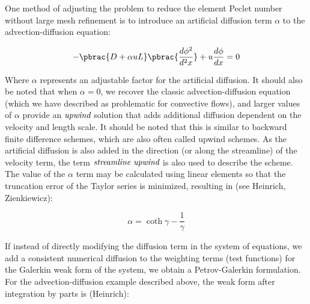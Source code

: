 One method of adjusting the problem to reduce the element Peclet number without large mesh refinement is to introduce an artificial diffusion term $\alpha$ to the advection-diffusion equation:

\begin{equation}
  -\pbrac{D+{\alpha}uL}\pbrac{\frac{d\phi^2}{d^2x}}+u\frac{d\phi}{dx}=0
  \label{eqn:directupwind}
\end{equation}

Where $\alpha$ represents an adjustable factor for the artificial diffusion. It should also be noted that when $\alpha=0$, we recover the classic advection-diffusion equation (which we have described as problematic for convective flows), and larger values of $\alpha$ provide an $\emph{upwind}$ solution that adds additional diffusion dependent on the velocity and length scale. It should be noted that this is similar to backward finite difference schemes, which are also often called upwind schemes. As the artificial diffusion is also added in the direction (or along the streamline) of the velocity term, the term $\emph{streamline upwind}$ is also used to describe the scheme. The value of the $\alpha$ term may be calculated using linear elements so that the truncation error of the Taylor series is minimized, resulting in (see Heinrich, Zienkiewicz):

\begin{equation}
  \alpha= {\coth{\gamma} - \frac{1}{\gamma}}
\end{equation}

If instead of directly modifying the diffusion term in the system of equations, we add a consistent numerical diffusion to the weighting terms (test functions) for the Galerkin weak form of the system, we obtain a Petrov-Galerkin formulation. For the advection-diffusion example described above, the weak form after integration by parts is (Heinrich):

